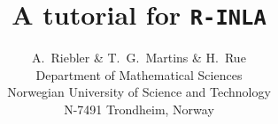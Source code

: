 \documentclass[a4paper, twoside, openright, chapterprefix, 11pt]{scrreprt}
\newcommand{\tv}{\texttt}
\begin{document}
\title{A tutorial for \tv{R-INLA}}
\author{A.\ Riebler \& T.\ G.\ Martins \& H.\ Rue\\
 Department of Mathematical Sciences\\
 Norwegian University of Science and Technology\\
 N-7491 Trondheim, Norway}
\maketitle
{} 



\tableofcontents

\pagestyle{headings}















\appendix
 


\end{document}
